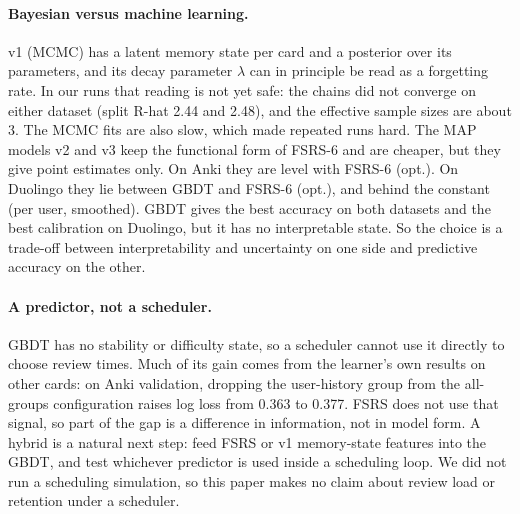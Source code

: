 \paragraph{Bayesian versus machine learning.}
v1 (MCMC) has a latent memory state per card and a posterior over its parameters, and its decay parameter $\lambda$ can in principle be read as a forgetting rate.
In our runs that reading is not yet safe: the chains did not converge on either dataset (split R-hat 2.44 and 2.48), and the effective sample sizes are about 3.
The MCMC fits are also slow, which made repeated runs hard.
The MAP models v2 and v3 keep the functional form of FSRS-6 and are cheaper, but they give point estimates only.
On Anki they are level with FSRS-6 (opt.). On Duolingo they lie between GBDT and FSRS-6 (opt.), and behind the constant (per user, smoothed).
GBDT gives the best accuracy on both datasets and the best calibration on Duolingo, but it has no interpretable state.
So the choice is a trade-off between interpretability and uncertainty on one side and predictive accuracy on the other.

\paragraph{A predictor, not a scheduler.}
GBDT has no stability or difficulty state, so a scheduler cannot use it directly to choose review times.
Much of its gain comes from the learner's own results on other cards: on Anki validation, dropping the user-history group from the all-groups configuration raises log loss from 0.363 to 0.377.
FSRS does not use that signal, so part of the gap is a difference in information, not in model form.
A hybrid is a natural next step: feed FSRS or v1 memory-state features into the GBDT, and test whichever predictor is used inside a scheduling loop.
We did not run a scheduling simulation, so this paper makes no claim about review load or retention under a scheduler.
